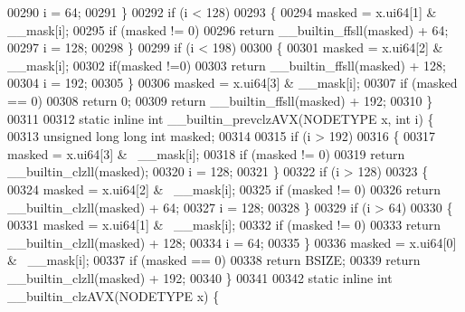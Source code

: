 \begin{DoxyCode}
00290                 i = 64;
00291         \}
00292         \textcolor{keywordflow}{if} (i < 128)
00293         \{
00294                 masked = x.ui64[1] & \_\_mask[i];
00295                 \textcolor{keywordflow}{if} (masked != 0)
00296                         \textcolor{keywordflow}{return} \_\_builtin\_ffsll(masked) + 64;
00297                 i = 128;
00298         \}
00299         \textcolor{keywordflow}{if} (i < 198)
00300         \{
00301                 masked = x.ui64[2] & \_\_mask[i];
00302                 \textcolor{keywordflow}{if}(masked !=0)
00303                         \textcolor{keywordflow}{return} \_\_builtin\_ffsll(masked) + 128;
00304                 i = 192;
00305         \}
00306         masked = x.ui64[3] & \_\_mask[i];
00307         \textcolor{keywordflow}{if} (masked == 0)
00308                 \textcolor{keywordflow}{return} 0;
00309         \textcolor{keywordflow}{return} \_\_builtin\_ffsll(masked) + 192;
00310 \}
00311 
00312 \textcolor{keyword}{static} \textcolor{keyword}{inline} \textcolor{keywordtype}{int} \_\_builtin\_prevclzAVX(NODETYPE x, \textcolor{keywordtype}{int} i) \{
00313         \textcolor{keywordtype}{unsigned} \textcolor{keywordtype}{long} \textcolor{keywordtype}{long} \textcolor{keywordtype}{int} masked;
00314 
00315         \textcolor{keywordflow}{if} (i > 192)
00316         \{
00317                 masked = x.ui64[3] & ~\_\_mask[i];
00318                 \textcolor{keywordflow}{if} (masked != 0)
00319                         \textcolor{keywordflow}{return} \_\_builtin\_clzll(masked);
00320                 i = 128;
00321         \}
00322         \textcolor{keywordflow}{if} (i > 128)
00323         \{
00324                 masked = x.ui64[2] & ~\_\_mask[i];
00325                 \textcolor{keywordflow}{if} (masked != 0)
00326                         \textcolor{keywordflow}{return} \_\_builtin\_clzll(masked) + 64;
00327                 i = 128;
00328         \}
00329         \textcolor{keywordflow}{if} (i > 64)
00330         \{
00331                 masked = x.ui64[1] & ~\_\_mask[i];
00332                 \textcolor{keywordflow}{if} (masked != 0)
00333                         \textcolor{keywordflow}{return} \_\_builtin\_clzll(masked) + 128;
00334                 i = 64;
00335         \}
00336         masked = x.ui64[0] & ~\_\_mask[i];
00337         \textcolor{keywordflow}{if} (masked == 0)
00338                 \textcolor{keywordflow}{return} BSIZE;
00339         \textcolor{keywordflow}{return} \_\_builtin\_clzll(masked) + 192;
00340 \}
00341 
00342 \textcolor{keyword}{static} \textcolor{keyword}{inline} \textcolor{keywordtype}{int} \_\_builtin\_clzAVX(NODETYPE x) \{

\end{DoxyCode}
